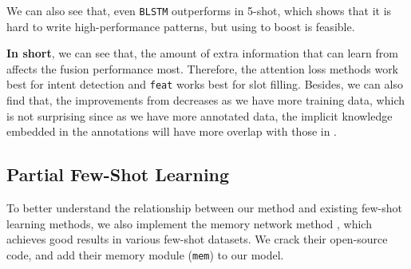 
We can also see that, even \texttt{BLSTM} outperforms \RE in 5-shot, which shows that it is hard to write high-performance \RE patterns, but using \RE to boost \NN is feasible.

\vspace{1.5mm}\noindent\textbf{In short}, 
we can see that, the amount of extra information that \NN can learn from \RE affects the fusion performance most. Therefore, the attention loss methods work best for intent detection and \texttt{feat} works best for slot filling.
Besides, we can also find that, the improvements from \RE decreases as we have more training data, which is not surprising since as we have more annotated data, the implicit knowledge embedded in the annotations will have more overlap with those in \RE.


\subsection{Partial Few-Shot Learning}
To better understand the relationship between our method and existing few-shot learning methods, we also implement the memory network method \cite{kaiser2017learning}, which achieves good results in various few-shot datasets. We crack their open-source code, and add their memory module (\texttt{mem}) to our \BLSTM model.


